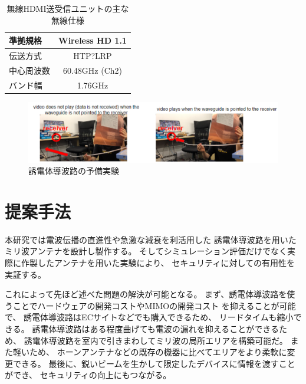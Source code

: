 \documentclass[technicalreport]{ieicej}
\begin{document}
\begin{table}[tb]
  \centering
  \label{table:wireless}
  \caption{無線HDMI送受信ユニットの主な無線仕様}
  \begin{tabular}{lc}
    \hline
    準拠規格 & Wireless HD 1.1 \\
    \hline\hline
    伝送方式 & HTP?LRP \\
    \hline
    中心周波数 & 60.48GHz (Ch2) \\
    \hline
    バンド幅 & 1.76GHz \\
    \hline
  \end{tabular}
 \end{table}

\begin{figure}[t]
  \begin{center}
    \includegraphics[bb=0 0 630.087950 152.271255, width=1.0\linewidth]{img/qualitative_experiment.pdf}
    \caption{誘電体導波路の予備実験}
    \label{fig:qualitative_experiment}
  \end{center}
\end{figure}


\section{提案手法}

本研究では電波伝播の直進性や急激な減衰を利活用した
誘電体導波路を用いたミリ波アンテナを設計し製作する。
そしてシミュレーション評価だけでなく実際に作製したアンテナを用いた実験により、
セキュリティに対しての有用性を実証する。

これによって先ほど述べた問題の解決が可能となる。
まず、誘電体導波路を使うことでハードウェアの開発コストやMIMOの開発コスト
を抑えることが可能で、
誘電体導波路はECサイトなどでも購入できるため、
リードタイムも縮小できる。
誘電体導波路はある程度曲げても電波の漏れを抑えることができるため、
誘電体導波路を室内で引きまわしてミリ波の局所エリアを構築可能だ。
また軽いため、
ホーンアンテナなどの既存の機器に比べてエリアをより柔軟に変更できる。
最後に、鋭いビームを生かして限定したデバイスに情報を渡すことができ、
セキュリティの向上にもつながる。
\end{document}
